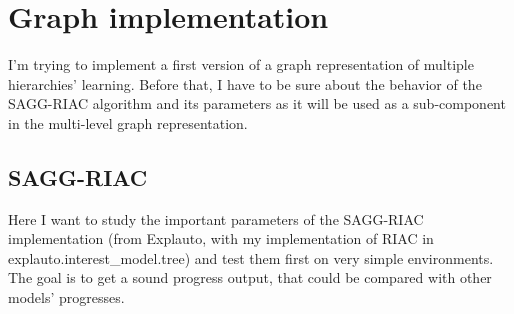 \documentclass[12pt]{article}
\begin{document}
	
	
%




%


	
\section{Graph implementation}

	I'm trying to implement a first version of a graph representation of multiple hierarchies' learning.
	Before that, I have to be sure about the behavior of the SAGG-RIAC algorithm and its parameters 
	as it will be used as a sub-component in the multi-level graph representation.

	\subsection{SAGG-RIAC}
	
		Here I want to study the important parameters of the SAGG-RIAC implementation 
		(from Explauto, with my implementation of RIAC in explauto.interest\_model.tree) and test them first on very simple environments.
		The goal is to get a sound progress output, that could be compared with other models' progresses.
		
\end{document}
